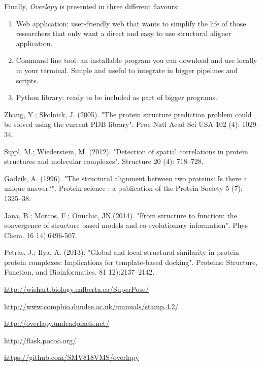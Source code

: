 \documentclass{article}
\begin{document}
Finally, \textit{Overlapy} is presented in three different flavours:
\begin{enumerate}
\item Web application: user-friendly web \cite{8} that wants to simplify the life of those researchers that only want a direct and easy to use structural aligner application.
\item Command line tool: an installable program you can download and use locally in your terminal. Simple and useful to integrate in bigger pipelines and scripts.
\item Python library: ready to be included as part of bigger programs.
\end{enumerate}

\pagebreak


\begin{thebibliography}{8}
Zhang, Y.; Skolnick, J. (2005). "The protein structure prediction problem could be solved using the current PDB library". Proc Natl Acad Sci USA 102 (4): 1029–34.

Sippl, M.; Wiederstein, M. (2012). "Detection of spatial correlations in protein structures and molecular complexes". Structure 20 (4): 718–728.

Godzik, A. (1996). "The structural alignment between two proteins: Is there a unique answer?". Protein science : a publication of the Protein Society 5 (7): 1325–38.

Jana, B.; Morcos, F.; Onuchic, JN.(2014). "From structure to function: the convergence of structure based models and co-evolutionary information". Phys Chem. 16 14):6496-507.

Petras, J.; Ilya, A. (2013). "Global and local structural similarity in protein–protein complexes: Implications for template-based docking". Proteins: Structure, Function, and Bioinformatics. 81 12):2137–2142.

\href{http://wishart.biology.ualberta.ca/SuperPose/}{http://wishart.biology.ualberta.ca/SuperPose/}

\href{http://www.compbio.dundee.ac.uk/manuals/stamp.4.2/}{http://www.compbio.dundee.ac.uk/manuals/stamp.4.2/}

\href{http://overlapy.undeadpixels.net/}{http://overlapy.undeadpixels.net/}

\href{http://flask.pocoo.org/}{http://flask.pocoo.org/}

\href{https://github.com/SMV818VMS/overlapy}{https://github.com/SMV818VMS/overlapy}


\end{thebibliography}
\end{document}
